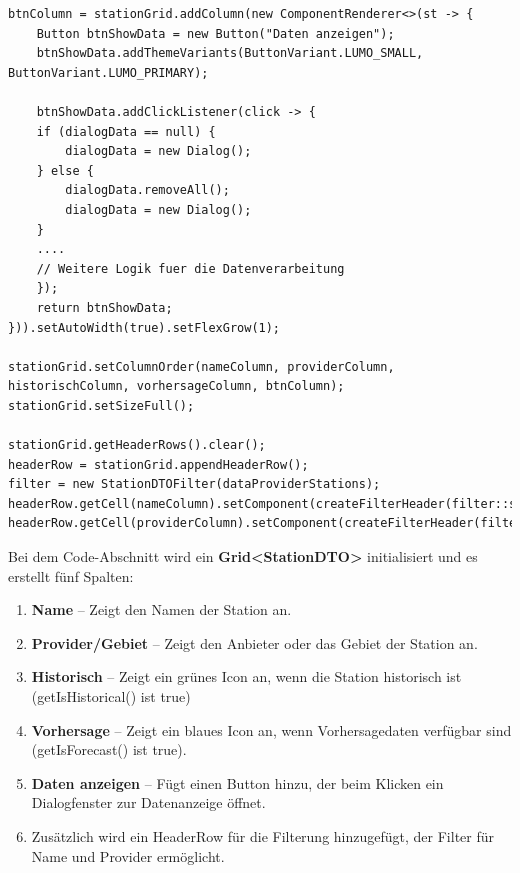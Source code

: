 \documentclass[a4paper,12pt]{scrreprt}
\begin{document}
\begin{lstlisting}
btnColumn = stationGrid.addColumn(new ComponentRenderer<>(st -> {
	Button btnShowData = new Button("Daten anzeigen");
	btnShowData.addThemeVariants(ButtonVariant.LUMO_SMALL, ButtonVariant.LUMO_PRIMARY);
		
	btnShowData.addClickListener(click -> {
	if (dialogData == null) {
		dialogData = new Dialog();
	} else {
		dialogData.removeAll();
		dialogData = new Dialog();
	}
	....
	// Weitere Logik fuer die Datenverarbeitung
	});
	return btnShowData;
})).setAutoWidth(true).setFlexGrow(1);
	
stationGrid.setColumnOrder(nameColumn, providerColumn, historischColumn, vorhersageColumn, btnColumn);
stationGrid.setSizeFull();
	
stationGrid.getHeaderRows().clear();
headerRow = stationGrid.appendHeaderRow();
filter = new StationDTOFilter(dataProviderStations);
headerRow.getCell(nameColumn).setComponent(createFilterHeader(filter::setStationName));
headerRow.getCell(providerColumn).setComponent(createFilterHeader(filter::setProvider));
\end{lstlisting}

Bei dem Code-Abschnitt wird ein \textbf{Grid<StationDTO>} initialisiert und es erstellt fünf Spalten:
\begin{enumerate}
\item \textbf{Name} – Zeigt den Namen der Station an.
\item \textbf{Provider/Gebiet} – Zeigt den Anbieter oder das Gebiet der Station an.
\item \textbf{Historisch} – Zeigt ein grünes Icon an, wenn die Station historisch ist (getIsHistorical() ist true)
\item \textbf{Vorhersage} – Zeigt ein blaues Icon an, wenn Vorhersagedaten verfügbar sind (getIsForecast() ist true).
\item \textbf{Daten anzeigen} – Fügt einen Button hinzu, der beim Klicken ein Dialogfenster zur Datenanzeige öffnet.
\item Zusätzlich wird ein HeaderRow für die Filterung hinzugefügt, der Filter für Name und Provider ermöglicht.
\end{enumerate}
\end{document}
